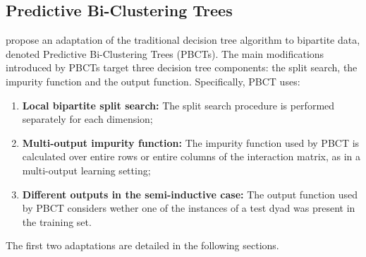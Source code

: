 \documentclass[sn-mathphys-num]{sn-jnl}%
\theoremstyle{thmstyleone}%
\theoremstyle{thmstyletwo}%
\theoremstyle{thmstylethree}%
\begin{document}
%
%
%    
%    



\subsection{Predictive Bi-Clustering Trees}
\label{sec:pbct}

\citet{pliakos_global_2018} propose an adaptation of the traditional decision tree algorithm to bipartite data, denoted Predictive Bi-Clustering Trees (PBCTs). 
The main modifications introduced by PBCTs target three decision tree components: the split search, the impurity function and the output function. Specifically, PBCT uses:
%
\begin{enumerate}
    \item \textbf{Local bipartite split search:} The split search procedure is performed separately for each dimension;
    \item \textbf{Multi-output impurity function:} The impurity function used by PBCT is calculated over entire rows or entire columns of the interaction matrix, as in a multi-output learning setting;
    \item \textbf{Different outputs in the semi-inductive case:} The output function used by PBCT considers wether one of the instances of a test dyad was present in the training set.
\end{enumerate}
%
The first two adaptations are detailed in the following sections.

\end{document}
